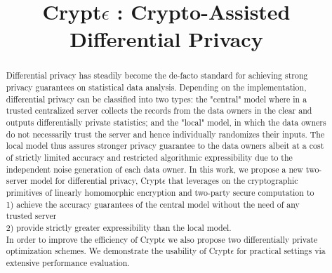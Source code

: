 \documentclass[sigconf]{acmart}
\begin{document}
\title{Crypt$\epsilon$ : Crypto-Assisted Differential Privacy}
\author{}
\begin{abstract}
Differential privacy has steadily become the de-facto standard for achieving strong privacy guarantees on statistical data analysis. Depending on the implementation, differential privacy can be classified into two types: the "central" model where in a trusted centralized server collects the records from the data owners in the clear and outputs differentially private statistics; and the "local" model, in which the data owners do not necessarily trust the server and hence individually randomizes their inputs. The local model thus assures stronger privacy guarantee to the data owners albeit at a cost of strictly limited accuracy and restricted algorithmic expressibility due to the independent noise generation of each data owner. In this work, we propose a new two-server model for differential privacy, Crypt$\epsilon$  that leverages on the cryptographic primitives of linearly homomorphic encryption and two-party secure computation to  \\
1) achieve the accuracy guarantees of the central model without the need of any trusted server \\
2) provide strictly greater expressibility than the local model. \\
In order to improve the efficiency of Crypt$\epsilon$ we also propose two differentially private optimization schemes.  We demonstrate the usability of Crypt$\epsilon$ for practical settings via extensive performance evaluation.
\end{abstract}

\maketitle





%

%






\end{document}
